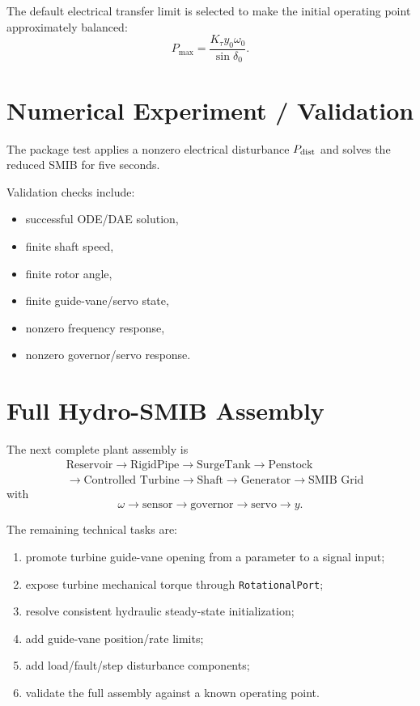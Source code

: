 \documentclass[10pt,a4paper]{article}
\begin{document}
The default electrical transfer limit is selected to make the initial operating point approximately balanced:
\[
P_{\max}
=
\frac{K_\tau y_0\omega_0}{\sin\delta_0}.
\]

\section{Numerical Experiment / Validation}
The package test applies a nonzero electrical disturbance \(P_{\rm dist}\) and solves the reduced SMIB for five seconds.

Validation checks include:
\begin{itemize}
\item successful ODE/DAE solution,
\item finite shaft speed,
\item finite rotor angle,
\item finite guide-vane/servo state,
\item nonzero frequency response,
\item nonzero governor/servo response.
\end{itemize}

\section{Full Hydro-SMIB Assembly}
The next complete plant assembly is
\[
\boxed{
\begin{aligned}
&\text{Reservoir}\rightarrow\text{RigidPipe}\rightarrow\text{SurgeTank}
\rightarrow\text{Penstock}\\
&\rightarrow\text{Controlled Turbine}\rightarrow\text{Shaft}
\rightarrow\text{Generator}\rightarrow\text{SMIB Grid}
\end{aligned}}
\]
with
\[
\omega\rightarrow\text{sensor}\rightarrow\text{governor}\rightarrow\text{servo}
\rightarrow y.
\]

The remaining technical tasks are:
\begin{enumerate}
\item promote turbine guide-vane opening from a parameter to a signal input;
\item expose turbine mechanical torque through \texttt{RotationalPort};
\item resolve consistent hydraulic steady-state initialization;
\item add guide-vane position/rate limits;
\item add load/fault/step disturbance components;
\item validate the full assembly against a known operating point.
\end{enumerate}
\end{document}
